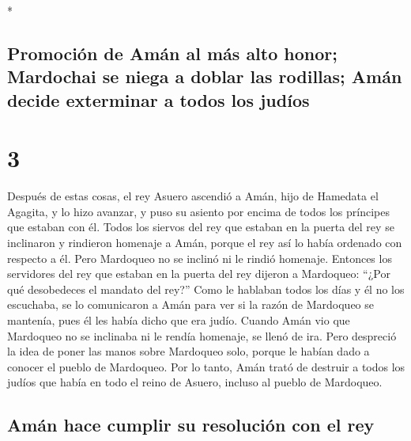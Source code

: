 \begin{paracol}{2}
\begin{otherlanguage}{english}
\end{otherlanguage}

\switchcolumn[0]*

\hypertarget{promociuxf3n-de-amuxe1n-al-muxe1s-alto-honor-mardochai-se-niega-a-doblar-las-rodillas-amuxe1n-decide-exterminar-a-todos-los-juduxedos}{%
\subsection{Promoción de Amán al más alto honor; Mardochai se niega a
doblar las rodillas; Amán decide exterminar a todos los
judíos}\label{promociuxf3n-de-amuxe1n-al-muxe1s-alto-honor-mardochai-se-niega-a-doblar-las-rodillas-amuxe1n-decide-exterminar-a-todos-los-juduxedos}}

\hypertarget{section-4}{%
\section{3}\label{section-4}}

 Después de estas cosas, el rey Asuero ascendió a Amán,
hijo de Hamedata el Agagita, y lo hizo avanzar, y puso su asiento por
encima de todos los príncipes que estaban con él.  Todos
los siervos del rey que estaban en la puerta del rey se inclinaron y
rindieron homenaje a Amán, porque el rey así lo había ordenado con
respecto a él. Pero Mardoqueo no se inclinó ni le rindió homenaje.
 Entonces los servidores del rey que estaban en la puerta
del rey dijeron a Mardoqueo: ``¿Por qué desobedeces el mandato del
rey?''  Como le hablaban todos los días y él no los
escuchaba, se lo comunicaron a Amán para ver si la razón de Mardoqueo se
mantenía, pues él les había dicho que era judío.  Cuando
Amán vio que Mardoqueo no se inclinaba ni le rendía homenaje, se llenó
de ira.  Pero despreció la idea de poner las manos sobre
Mardoqueo solo, porque le habían dado a conocer el pueblo de Mardoqueo.
Por lo tanto, Amán trató de destruir a todos los judíos que había en
todo el reino de Asuero, incluso al pueblo de Mardoqueo.

\hypertarget{amuxe1n-hace-cumplir-su-resoluciuxf3n-con-el-rey}{%
\subsection{Amán hace cumplir su resolución con el
rey}\label{amuxe1n-hace-cumplir-su-resoluciuxf3n-con-el-rey}}


\end{paracol}
